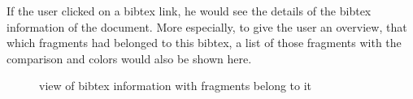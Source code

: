If the user clicked on a bibtex link, he would see the details of the bibtex information of the document. More especially, to give the user an overview, that which fragments had belonged to this bibtex, a list of those fragments with the comparison and colors would also be shown here.

\begin{figure}[!h]
  \centering
  \caption{view of bibtex information with fragments belong to it}
  \label{fig:Bibliography_frag_view}
\end{figure}
